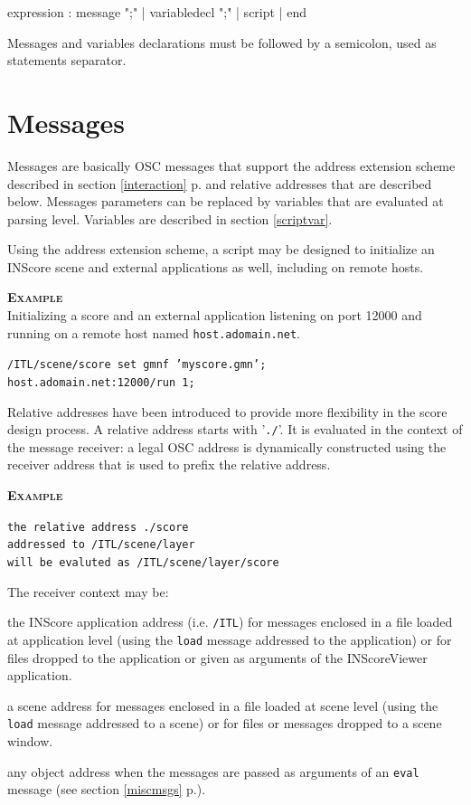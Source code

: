 \documentclass[a4paper,twoside]{report}
\newcommand{\sublevel}[1]	{\section{#1}}
\newcommand{\fullref}[1]	{\ref{#1} p.\pageref{#1}}
\newcommand{\OSC}[1]		{\texttt{#1}}
\newcommand{\example}		{\textbf{\hspace{-1.5cm}\textbf{\textsc{Example }}}}
\let\olditemize\itemize
\let\oldenditemize\enditemize
\renewenvironment{itemize} 	{\olditemize \setlength{\itemsep}{1mm}}{\oldenditemize}
\newcommand{\sample}	[1]			{\vspace{-2mm}\begin{center}\colorbox{mygrey}{
								\begin{minipage}[t]{0.9\columnwidth} 
								{\small \texttt{#1}}
								\end{minipage}}\end{center}}
\begin{document}
\begin{rail}
expression :  
		 	message ";"
		| 	variabledecl ";"
		| 	script
		|   end
\end{rail}

Messages and variables declarations must be followed by a semicolon, used as statements separator.

\sublevel{Messages}\label{scriptmsgs}

Messages are basically OSC messages that support the address extension scheme described in section \fullref{interaction} and relative addresses that are described below.
Messages parameters can be replaced by variables that are evaluated at parsing level. Variables are described in section \ref{scriptvar}.

Using the address extension scheme, a script may be designed to initialize an INScore scene and external applications as well, including on remote hosts.

\example\\
Initializing a score and an external application listening on port 12000 and running on a remote host named \OSC{host.adomain.net}.
\sample{/ITL/scene/score set gmnf 'myscore.gmn';\\
host.adomain.net:12000/run 1;
}

Relative addresses have been introduced to provide more flexibility in the score design process. A relative address starts with '\OSC{./}'. It is evaluated in the context of the message receiver: a legal OSC address is dynamically constructed using the receiver address that is used to prefix the relative address. 

\example
\sample{the relative address \hspace*{3mm}./score \\
addressed to \hspace*{15.4mm}/ITL/scene/layer\\
will be evaluted as \hspace*{4mm}/ITL/scene/layer/score
}

The receiver context may be:
\begin{itemize}
\item the INScore application address (i.e. \OSC{/ITL}) for messages enclosed in a file loaded at application level (using the \OSC{load} message addressed to the application) or for files dropped to the application or given as arguments of the INScoreViewer application.
\item a scene address for messages enclosed in a file loaded at scene level (using the \OSC{load} message addressed to a scene) or for files or messages dropped to a scene window.
\item any object address when the messages are passed as arguments of an \OSC{eval} message (see section \fullref{miscmsgs}).
\end{itemize}
\end{document}
